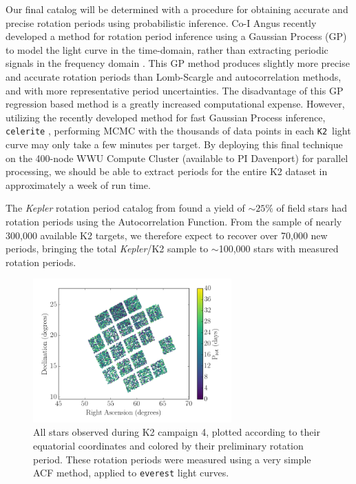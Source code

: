 \documentclass[12pt]{article}
\newcommand{\Kepler}{\textsl{Kepler}\xspace}
\newcommand{\ktwo}{{\tt K2}}
\begin{document}
Our final catalog will be determined with a procedure for obtaining accurate and precise
rotation periods using probabilistic inference.
Co-I Angus recently developed a method for rotation period inference using a
Gaussian Process (GP) to model the light curve in the time-domain, rather than
extracting periodic signals in the frequency domain \citet{angus2016c}.
This GP method produces slightly more precise and accurate rotation periods than Lomb-Scargle and autocorrelation methods, and with more representative period uncertainties.
The disadvantage of this GP regression based method is a greatly increased computational expense. However, utilizing the recently developed method for fast Gaussian Process
inference, {\tt celerite} \citep{foreman-mackey2017}, performing MCMC
with the thousands of data points in each \ktwo\ light curve may only take a few
minutes per target. By deploying this final technique on the 400-node WWU Compute Cluster (available to PI Davenport) for parallel processing, we should be able to extract periods for the entire K2 dataset in approximately a week of run time.




 The \Kepler rotation period catalog from \citet{mcquillan2014} found a yield
 of $\sim25\%$ of field stars had rotation periods using the
 Autocorrelation Function.
From the sample of nearly 300,000 available K2 targets, we therefore expect to recover
over 70,000 new periods, bringing the total \Kepler/K2 sample to $\sim$100,000
stars with measured rotation periods.

\begin{figure}[!t]
\centering
\includegraphics[width=3in]{ra_vs_dec_period_c04.png}
\caption{All stars observed during K2 campaign 4, plotted according to their
    equatorial coordinates and colored by their preliminary rotation period.
These rotation periods were measured using a very simple ACF method, applied
    to {\tt everest} \citep{luger2015} light curves.}
\label{fig:kalesalad}
\end{figure}
\end{document}

